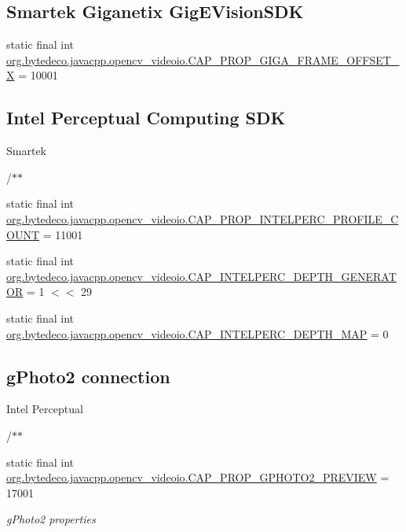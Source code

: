 \subsection*{Smartek Giganetix Gig\+E\+Vision\+S\+DK}
\begin{DoxyCompactItemize}
\item 
static final int \hyperlink{group__videoio__flags__others_gab4ddba80d08c7d12c1cf05ad5f3182a0}{org.\+bytedeco.\+javacpp.\+opencv\+\_\+videoio.\+C\+A\+P\+\_\+\+P\+R\+O\+P\+\_\+\+G\+I\+G\+A\+\_\+\+F\+R\+A\+M\+E\+\_\+\+O\+F\+F\+S\+E\+T\+\_\+X} = 10001
\end{DoxyCompactItemize}
\subsection*{Intel Perceptual Computing S\+DK}
\label{_amgrpfb2ec7d2cacf22b3dd4fcd13264794c9}%
 Smartek 

/$\ast$$\ast$ \begin{DoxyCompactItemize}
\item 
static final int \hyperlink{group__videoio__flags__others_gaa9b3af0c8f28aea91749058639e286f7}{org.\+bytedeco.\+javacpp.\+opencv\+\_\+videoio.\+C\+A\+P\+\_\+\+P\+R\+O\+P\+\_\+\+I\+N\+T\+E\+L\+P\+E\+R\+C\+\_\+\+P\+R\+O\+F\+I\+L\+E\+\_\+\+C\+O\+U\+NT} = 11001
\item 
static final int \hyperlink{group__videoio__flags__others_gab66c209bfa351264f55727db980328f2}{org.\+bytedeco.\+javacpp.\+opencv\+\_\+videoio.\+C\+A\+P\+\_\+\+I\+N\+T\+E\+L\+P\+E\+R\+C\+\_\+\+D\+E\+P\+T\+H\+\_\+\+G\+E\+N\+E\+R\+A\+T\+OR} = 1 $<$$<$ 29
\item 
static final int \hyperlink{group__videoio__flags__others_ga81daac9eadb7d66e1f26c0d984b68c82}{org.\+bytedeco.\+javacpp.\+opencv\+\_\+videoio.\+C\+A\+P\+\_\+\+I\+N\+T\+E\+L\+P\+E\+R\+C\+\_\+\+D\+E\+P\+T\+H\+\_\+\+M\+AP} = 0
\end{DoxyCompactItemize}
\subsection*{g\+Photo2 connection}
\label{_amgrp190de4ba27ec870ae1edac91cdcae582}%
 Intel Perceptual 

/$\ast$$\ast$ \begin{DoxyCompactItemize}
\item 
static final int \hyperlink{group__videoio__flags__others_ga2d0e0d7cb640eb1dc635b6351fc64c42}{org.\+bytedeco.\+javacpp.\+opencv\+\_\+videoio.\+C\+A\+P\+\_\+\+P\+R\+O\+P\+\_\+\+G\+P\+H\+O\+T\+O2\+\_\+\+P\+R\+E\+V\+I\+EW} = 17001
\begin{DoxyCompactList}\small\item\em g\+Photo2 properties \end{DoxyCompactList}\end{DoxyCompactItemize}
